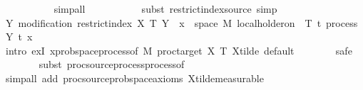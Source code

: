 \begin{isabellebody}
\ \ \ \ \ \ \ \ \ \isamarkupfalse%
\ simp{\isacharunderscore}{\kern0pt}all\isanewline
\ \ \ \ \ \ \ \ \ \isamarkupfalse%
\ {\isacharparenleft}{\kern0pt}subst\ restrict{\isacharunderscore}{\kern0pt}index{\isacharunderscore}{\kern0pt}source{\isacharcomma}{\kern0pt}\ simp{\isacharparenright}{\kern0pt}\isanewline
\ \ \ \ \ \ \isamarkupfalse%
\isanewline
\ \ \ \ \isamarkupfalse%
\ \isamarkupfalse%
\ {\isachardoublequoteopen}{\isasymexists}Y{\isachardot}{\kern0pt}\ modification\ {\isacharparenleft}{\kern0pt}restrict{\isacharunderscore}{\kern0pt}index\ X\ {\isacharbraceleft}{\kern0pt}{}{\isachardot}{\kern0pt}{\isachardot}{\kern0pt}T{\isacharbraceright}{\kern0pt}{\isacharparenright}{\kern0pt}\ Y\ {\isasymand}\ {\isacharparenleft}{\kern0pt}{\isasymforall}x\ {\isasymin}\ space\ {\isacharquery}{\kern0pt}M{\isachardot}{\kern0pt}\ local{\isacharunderscore}{\kern0pt}holder{\isacharunderscore}{\kern0pt}on\ {\isasymgamma}\ {\isacharbraceleft}{\kern0pt}{}{\isachardot}{\kern0pt}{\isachardot}{\kern0pt}T{\isacharbraceright}{\kern0pt}\ {\isacharparenleft}{\kern0pt}{\isasymlambda}t{\isachardot}{\kern0pt}\ process\ Y\ t\ x{\isacharparenright}{\kern0pt}{\isacharparenright}{\kern0pt}{\isachardoublequoteclose}\isanewline
\ \ \ \ \ \ \isamarkupfalse%
\ {\isacharparenleft}{\kern0pt}intro\ exI{\isacharbrackleft}{\kern0pt}\ x{\isacharequal}{\kern0pt}{\isachardoublequoteopen}{\isacharparenleft}{\kern0pt}prob{\isacharunderscore}{\kern0pt}space{\isachardot}{\kern0pt}process{\isacharunderscore}{\kern0pt}of\ {\isacharquery}{\kern0pt}M\ {\isacharparenleft}{\kern0pt}proc{\isacharunderscore}{\kern0pt}target\ X{\isacharparenright}{\kern0pt}\ {\isacharbraceleft}{\kern0pt}{}{\isachardot}{\kern0pt}{\isachardot}{\kern0pt}T{\isacharbraceright}{\kern0pt}\ X{\isacharunderscore}{\kern0pt}tilde\ default{\isacharparenright}{\kern0pt}{\isachardoublequoteclose}{\isacharbrackright}{\kern0pt}{\isacharparenright}{\kern0pt}\isanewline
\ \ \ \ \ \ \isamarkupfalse%
\ safe\isanewline
\ \ \ \ \ \ \isamarkupfalse%
\ {\isacharparenleft}{\kern0pt}subst\ proc{\isacharunderscore}{\kern0pt}source{\isachardot}{\kern0pt}process{\isacharunderscore}{\kern0pt}process{\isacharunderscore}{\kern0pt}of{\isacharparenright}{\kern0pt}\isanewline
\ \ \ \ \ \ \ \ \ \isamarkupfalse%
\ {\isacharparenleft}{\kern0pt}simp{\isacharunderscore}{\kern0pt}all\ add{\isacharcolon}{\kern0pt}\ proc{\isacharunderscore}{\kern0pt}source{\isachardot}{\kern0pt}prob{\isacharunderscore}{\kern0pt}space{\isacharunderscore}{\kern0pt}axioms\ X{\isacharunderscore}{\kern0pt}tilde{\isacharunderscore}{\kern0pt}measurable{\isacharparenright}{\kern0pt}\isanewline

\end{isabellebody}
